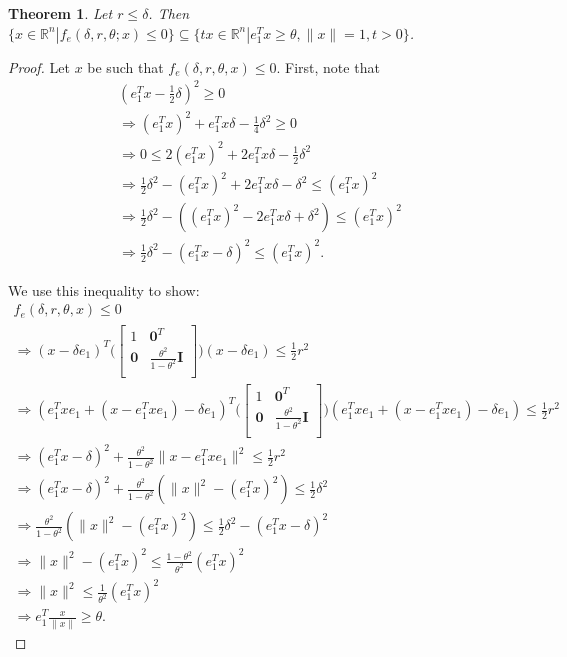 \documentclass{article}
\newtheorem{theorem}{Theorem}[section]
\theoremstyle{case}
\newcommand{\rn}{{\mathbb R^{n}}}
\begin{document}
\begin{theorem}
\label{ellipse_in_cone}
Let $r \le \delta$.
Then $\{x \in \rn | f_e(\delta, r, \theta; x) \le 0\} \subseteq \{tx\in\rn| e_1^T x \ge \theta,\|x\|=1, t>0\}$.
\end{theorem}


\begin{proof}
Let $x$ be such that $f_e(\delta, r, \theta, x) \le 0$.
First, note that
\begin{align*}
(e_1^Tx - \frac 1 2 \delta )^2\ge 0\\
\Longrightarrow (e_1^Tx)^2 + e_1^Tx\delta  - \frac 1 4 \delta^2 \ge 0\\
\Longrightarrow 0 \le 2(e_1^Tx)^2 + 2e_1^Tx\delta  - \frac 1 2 \delta^2\\
\Longrightarrow \frac 1 2 \delta^2 - (e_1^Tx)^2 + 2e_1^Tx\delta - \delta^2 \le (e_1^Tx)^2 \\
\Longrightarrow \frac 1 2 \delta^2 - \left((e_1^Tx)^2 - 2e_1^Tx\delta + \delta^2\right) \le (e_1^Tx)^2 \\
\Longrightarrow \frac 1 2 \delta^2 - (e_1^Tx - \delta)^2 \le (e_1^Tx)^2.
\end{align*}

We use this inequality to show:
\begin{align*}
f_e(\delta, r, \theta, x) \le 0 \\
\Longrightarrow (x - \delta e_1)^T\bigg(\begin{bmatrix}
1 & \boldsymbol0^T \\
\boldsymbol 0 & \frac{\theta^2}{1 - \theta^2} \boldsymbol I \\
\end{bmatrix}\bigg)(x - \delta e_1) \le \frac 1 2 r^2 \\
\Longrightarrow (e_1^Txe_1 + (x - e_1^Txe_1) - \delta e_1)^T\bigg(\begin{bmatrix}
1 & \boldsymbol0^T \\
\boldsymbol 0 & \frac{\theta^2}{1 - \theta^2} \boldsymbol I \\
\end{bmatrix}\bigg)(e_1^Txe_1 + (x - e_1^Txe_1) - \delta e_1) \le \frac 1 2 r^2 \\
\Longrightarrow
(e_1^Tx - \delta)^2 + \frac{\theta^2}{1 - \theta^2}\|x - e_1^Tx e_1\|^2 \le \frac 1 2 r^2 \\
\Longrightarrow
(e_1^Tx - \delta)^2 + \frac{\theta^2}{1 - \theta^2}(\|x\|^2 - (e_1^Tx)^2) \le \frac 1 2 \delta^2 \\
\Longrightarrow\frac{\theta^2}{1 - \theta^2}(\|x\|^2 - (e_1^Tx)^2) \le \frac 1 2 \delta^2 - (e_1^Tx - \delta)^2\\
\Longrightarrow\|x\|^2 - (e_1^Tx)^2 \le \frac{1 - \theta^2}{\theta^2}(e_1^Tx)^2 \\
\Longrightarrow\|x\|^2 \le \frac 1 {\theta^2}(e_1^Tx)^2 \\
\Longrightarrow e_1^T\frac{x}{\|x\|} \ge \theta.
\end{align*}
\end{proof}
\end{document}
